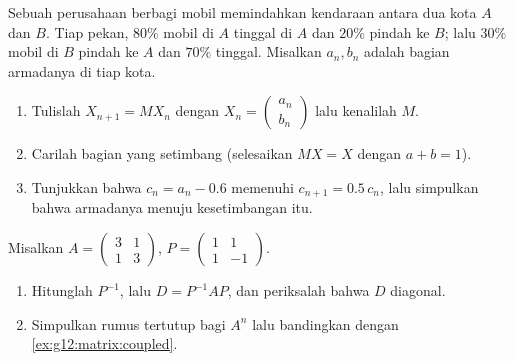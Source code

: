 \begin{exercise}[$\star\star$]\label{exo:g12:matrix:7}
Sebuah perusahaan berbagi mobil memindahkan kendaraan antara dua kota $A$ dan $B$.
Tiap pekan, $80\%$ mobil di $A$ tinggal di $A$ dan $20\%$ pindah ke $B$; lalu $30\%$
mobil di $B$ pindah ke $A$ dan $70\%$ tinggal. Misalkan $a_n, b_n$ adalah
bagian armadanya di tiap kota.
\begin{omfigure}
\end{omfigure}
\begin{enumerate}
  \item Tulislah $X_{n+1} = MX_n$ dengan
        $X_n = \begin{pmatrix} a_n\\ b_n\end{pmatrix}$ lalu kenalilah $M$.
  \item Carilah bagian yang setimbang (selesaikan $MX = X$ dengan
        $a + b = 1$).
  \item Tunjukkan bahwa $c_n = a_n - 0.6$ memenuhi $c_{n+1} = 0.5\,c_n$, lalu
        simpulkan bahwa  armadanya menuju kesetimbangan itu.
\end{enumerate}
\end{exercise}

\begin{exercise}[$\star\star\star$]\label{exo:g12:matrix:8}
Misalkan $A = \begin{pmatrix} 3 & 1\\ 1 & 3 \end{pmatrix}$,
$P = \begin{pmatrix} 1 & 1\\ 1 & -1 \end{pmatrix}$.
\begin{enumerate}
  \item Hitunglah $P^{-1}$, lalu $D = P^{-1}AP$, dan periksalah bahwa $D$
        diagonal.
  \item Simpulkan rumus tertutup bagi $A^n$ lalu bandingkan dengan
        \cref{ex:g12:matrix:coupled}.
\end{enumerate}
\end{exercise}

